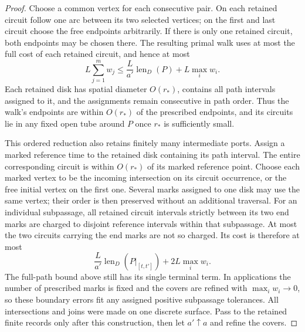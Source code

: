 \documentclass[11pt]{article}
\numberwithin{equation}{section}
\theoremstyle{definition}
\theoremstyle{remark}
\newcommand{\1}{\mathbf 1}
\begin{document}
\begin{proof}
Choose a common vertex for each consecutive pair.  On each retained
circuit follow one arc between its two selected vertices; on the
first and last circuit choose the free endpoints arbitrarily.  If
there is only one retained circuit, both endpoints may be chosen
there.  The resulting primal walk uses at most the full cost of
each retained circuit, and hence at most
\[
 L\sum_{j=1}^m w_j
 \le \frac{L}{a'}\operatorname{len}_D(P)+L\max_iw_i.
\]
Each retained disk has spatial diameter $O(r_*)$, contains all path
intervals assigned to it, and the assignments remain consecutive in
path order.  Thus the walk's endpoints are within $O(r_*)$ of the
prescribed endpoints, and its circuits lie in any fixed open tube
around $P$ once $r_*$ is sufficiently small.

This ordered reduction also retains finitely many intermediate ports.
Assign a marked reference time to the retained disk containing its
path interval.  The entire corresponding circuit is within $O(r_*)$
of its marked reference point.  Choose each marked vertex to be the incoming intersection on its
circuit occurrence, or the free initial vertex on the first one.
Several marks assigned to one disk may use the same vertex; their
order is then preserved without an additional traversal.  For an individual subpassage,
all retained circuit intervals strictly between its two end marks
are charged to disjoint reference intervals within that subpassage.
At most the two circuits carrying the end marks are not so charged.
Its cost is therefore at most
\[
 \frac{L}{a'}\operatorname{len}_D(P|_{[t,t']})
       +2L\max_iw_i.
\]
The full-path bound above still has its single terminal term.  In
applications the number of prescribed marks is fixed and the covers
are refined with $\max_iw_i\to0$, so these boundary errors fit any
assigned positive subpassage tolerances.  All intersections and joins
were made on one discrete surface.  Pass to the retained finite
records only after this construction, then let $a'\uparrow a$ and
refine the covers.


\end{proof}
\end{document}
